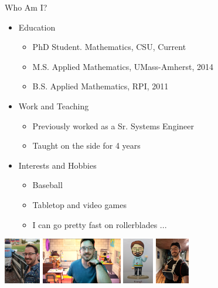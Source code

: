 {}\documentclass[letterpaper,
compress,
xcolor=x11names,
]{beamer}
\begin{document}
\begin{frame}{Who Am I?}
	\begin{itemize}
		\item Education
		\begin{itemize}
			\item PhD Student. Mathematics, CSU, Current
			\item M.S. Applied Mathematics, UMass-Amherst, 2014
			\item B.S. Applied Mathematics, RPI, 2011
		\end{itemize}
		\item Work and Teaching
		\begin{itemize}
			\item Previously worked as a Sr. Systems Engineer
			\item Taught on the side for 4 years
		\end{itemize}
		\item Interests and Hobbies
		\begin{itemize}
			\item Baseball
			\item Tabletop and video games
			\item I can go pretty fast on rollerblades ... 
		\end{itemize}
	\end{itemize}
	\begin{center}
		\includegraphics[height = 2cm]{ChrisPawSox.jpg}
		\includegraphics[height = 2cm]{Chris_AC.png}
		\includegraphics[height = 2cm]{ChrisMii.jpg}
		\includegraphics[angle = 90, height = 2cm]{Broken_Chris.jpg}
	\end{center}
\end{frame}
\end{document}

